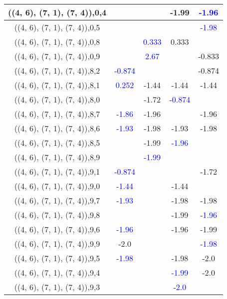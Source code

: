 \documentclass{article}
\begin{document}
\begin{center}
\begin{longtable}{|c|c|c|c|c|}
        	\hline
        	((4, 6), (7, 1), (7, 4)),0,4&&&-1.99& \textcolor{blue}{-1.96}\\
        	\hline
        	((4, 6), (7, 1), (7, 4)),0,5&&&& \textcolor{blue}{-1.98}\\
        	\hline
        	((4, 6), (7, 1), (7, 4)),0,8&& \textcolor{blue}{0.333}&0.333&\\
        	\hline
        	((4, 6), (7, 1), (7, 4)),0,9&& \textcolor{blue}{2.67}&&-0.833\\
        	\hline
        	((4, 6), (7, 1), (7, 4)),8,2& \textcolor{blue}{-0.874}&&&-0.874\\
        	\hline
        	((4, 6), (7, 1), (7, 4)),8,1& \textcolor{blue}{0.252}&-1.44&-1.44&-1.44\\
        	\hline
        	((4, 6), (7, 1), (7, 4)),8,0&&-1.72& \textcolor{blue}{-0.874}&\\
        	\hline
        	((4, 6), (7, 1), (7, 4)),8,7& \textcolor{blue}{-1.86}&-1.96&&-1.96\\
        	\hline
        	((4, 6), (7, 1), (7, 4)),8,6& \textcolor{blue}{-1.93}&-1.98&-1.93&-1.98\\
        	\hline
        	((4, 6), (7, 1), (7, 4)),8,5&&-1.99& \textcolor{blue}{-1.96}&\\
        	\hline
        	((4, 6), (7, 1), (7, 4)),8,9&& \textcolor{blue}{-1.99}&&\\
        	\hline
        	((4, 6), (7, 1), (7, 4)),9,1& \textcolor{blue}{-0.874}&&&-1.72\\
        	\hline
        	((4, 6), (7, 1), (7, 4)),9,0& \textcolor{blue}{-1.44}&&-1.44&\\
        	\hline
        	((4, 6), (7, 1), (7, 4)),9,7& \textcolor{blue}{-1.93}&&-1.98&-1.98\\
        	\hline
        	((4, 6), (7, 1), (7, 4)),9,8&&&-1.99& \textcolor{blue}{-1.96}\\
        	\hline
        	((4, 6), (7, 1), (7, 4)),9,6& \textcolor{blue}{-1.96}&&-1.96&-1.99\\
        	\hline
        	((4, 6), (7, 1), (7, 4)),9,9&-2.0&&& \textcolor{blue}{-1.98}\\
        	\hline
        	((4, 6), (7, 1), (7, 4)),9,5& \textcolor{blue}{-1.98}&&-1.98&-2.0\\
        	\hline
        	((4, 6), (7, 1), (7, 4)),9,4&&& \textcolor{blue}{-1.99}&-2.0\\
        	\hline
        	((4, 6), (7, 1), (7, 4)),9,3&&& \textcolor{blue}{-2.0}&\\

\end{longtable}
\end{center}
\end{document}
